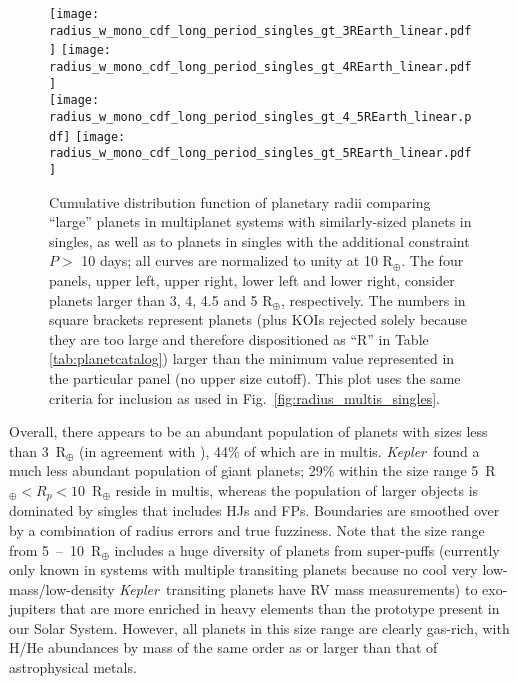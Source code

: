 \documentclass{aastex62}
\newcommand{\ik}{{\it Kepler~}}
\begin{document}
\begin{figure}
    \centering
    \texttt{[image: radius\_w\_mono\_cdf\_long\_period\_singles\_gt\_3REarth\_linear.pdf]}
    \texttt{[image: radius\_w\_mono\_cdf\_long\_period\_singles\_gt\_4REarth\_linear.pdf]}\\
    \texttt{[image: radius\_w\_mono\_cdf\_long\_period\_singles\_gt\_4\_5REarth\_linear.pdf]}
    \texttt{[image: radius\_w\_mono\_cdf\_long\_period\_singles\_gt\_5REarth\_linear.pdf]}
    \caption{Cumulative distribution function of planetary radii comparing ``large'' planets in multiplanet systems with similarly-sized planets in singles, as well as to planets in singles with the additional constraint $P >$ 10 days; all curves are normalized to unity at 10 R$_{\oplus}$. The four panels, upper left, upper right, lower left and lower right, consider planets larger than 3, 4, 4.5 and 5 R$_\oplus$, respectively. The numbers in square brackets represent planets (plus KOIs rejected solely because they are too large and therefore dispositioned as ``R''  in Table \ref{tab:planetcatalog}) larger than the minimum value represented in the particular panel (no upper size cutoff). This plot uses the same criteria for inclusion as used in Fig.~\ref{fig:radius_multis_singles}.}%
    \label{fig:large_radius_multiplicities_split}
\end{figure}

Overall, there appears to be an abundant population of planets with sizes less than 3~R$_\oplus$ (in agreement with \citealt{Kite:2019,Hsu:2019}), 44\% of which are in multis.  \ik found a much less abundant population of giant planets; 29\% within the size range 5~R$_\oplus < R_p < 10$~R$_\oplus$ reside in multis, whereas the population of larger objects is dominated by singles that includes HJs and FPs.  Boundaries are smoothed over by a combination of radius errors and true fuzziness.  Note that the size range from 5~--~10~R$_\oplus$ includes a huge diversity of planets from super-puffs (currently only known in systems with multiple transiting planets because no cool very low-mass/low-density \ik transiting planets have RV mass measurements) to exo-jupiters that are more enriched in heavy elements than the prototype present in our Solar System.  However, all planets in this size range are clearly gas-rich, with H/He abundances by mass of the same order as or larger than that of astrophysical metals. 
\end{document}
